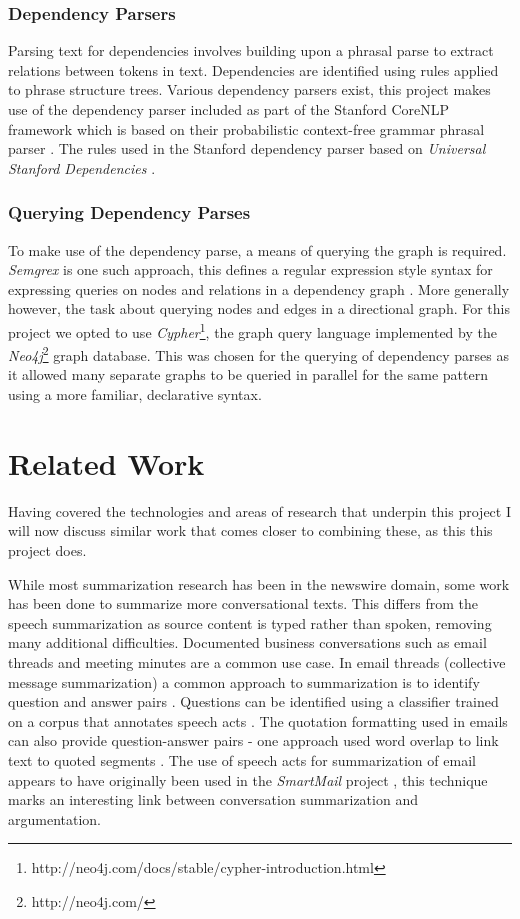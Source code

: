       \subsubsection{Dependency Parsers}
        Parsing text for dependencies involves building upon a phrasal parse to extract relations between tokens in text. Dependencies are identified using rules applied to phrase structure trees. Various dependency parsers exist, this project makes use of the dependency parser included as part of the Stanford CoreNLP framework \cite{de2006generating} which is based on their probabilistic context-free grammar phrasal parser \cite{klein2003accurate}. The rules used in the Stanford dependency parser based on \textit{Universal Stanford Dependencies} \cite{de2014universal}.
      \subsubsection{Querying Dependency Parses}
        To make use of the dependency parse, a means of querying the graph is required. \textit{Semgrex} is one such approach, this defines a regular expression style syntax for expressing queries on nodes and relations in a dependency graph \cite{Chambers2007}. More generally however, the task about querying nodes and edges in a directional graph. For this project we opted to use \textit{Cypher}\footnote{http://neo4j.com/docs/stable/cypher-introduction.html}, the graph query language implemented by the \textit{Neo4j}\footnote{http://neo4j.com/} graph database. This was chosen for the querying of dependency parses as it allowed many separate graphs to be queried in parallel for the same pattern using a more familiar, declarative syntax.

  \section{Related Work}
    Having covered the technologies and areas of research that underpin this project I will now discuss similar work that comes closer to combining these, as this this project does.

    While most summarization research has been in the newswire domain, some work has been done to summarize more conversational texts. This differs from the speech summarization as source content is typed rather than spoken, removing many additional difficulties. Documented business conversations such as email threads and meeting minutes are a common use case. In email threads (collective message summarization) a common approach to summarization is to identify question and answer pairs \cite{shrestha2007using,shrestha2004detection,carenini2007summarizing}. Questions can be identified using a classifier trained on a corpus that annotates speech acts \cite{shrestha2004detection}. The quotation formatting used in emails can also provide question-answer pairs - one approach used word overlap to link text to quoted segments \cite{carenini2007summarizing}. The use of speech acts for summarization of email appears to have originally been used in the \textit{SmartMail} project \cite{corston2004task}, this technique marks an interesting link between conversation summarization and argumentation.

